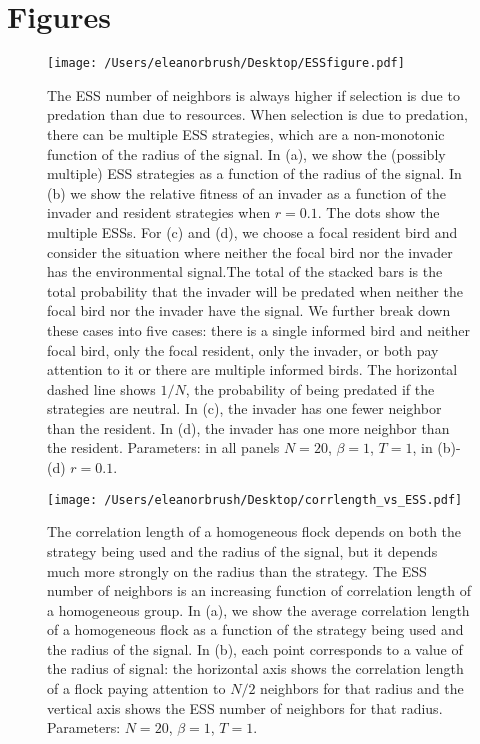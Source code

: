 \documentclass{article}
\begin{document}
\newpage
\section{Figures }
\begin{figure}
\texttt{[image: /Users/eleanorbrush/Desktop/ESSfigure.pdf]}
\caption{\label{ESS} The ESS number of neighbors is always higher if selection is due to predation than due to resources. When selection is due to predation, there can be multiple ESS strategies, which are a non-monotonic function of the radius of the signal. In (a), we show the (possibly multiple) ESS strategies as a function of the radius of the signal. In (b) we show the relative fitness of an invader as a function of the invader and resident strategies when $r=0.1$. The dots show the multiple ESSs. For (c) and (d), we choose a focal resident bird and consider the situation where neither the focal bird nor the invader has the environmental signal.The total of the stacked bars is the total probability that the invader will be predated when neither the focal bird nor the invader have the signal.  We further break down these cases into five cases: there is a single informed bird and neither focal bird, only the focal resident, only the invader, or both pay attention to it or there are multiple informed birds. The horizontal dashed line shows $1/N$, the probability of being predated if the strategies are neutral. In (c), the invader has one fewer neighbor than the resident. In (d), the invader has one more neighbor than the resident. Parameters:  in all panels $N=20$, $\beta=1$, $T=1$, in (b)-(d) $r=0.1$. 
}
\end{figure}

\begin{figure}
\texttt{[image: /Users/eleanorbrush/Desktop/corrlength\_vs\_ESS.pdf]}
\caption{\label{corrESS}
The correlation length of a homogeneous flock depends on both the strategy being used and the radius of the signal, but it depends much more strongly on the radius than the strategy. The ESS number of neighbors is an increasing function of correlation length of a homogeneous group. In (a), we show the average correlation length of a homogeneous flock as a function of the strategy being used and the radius of the signal. In (b), each point corresponds to a value of the radius of signal: the horizontal axis shows the correlation length of a flock paying attention to $N/2$ neighbors for that radius and the vertical axis shows the ESS number of neighbors for that radius. Parameters: $N=20$, $\beta=1$, $T=1$.
}
\end{figure}
\end{document}
